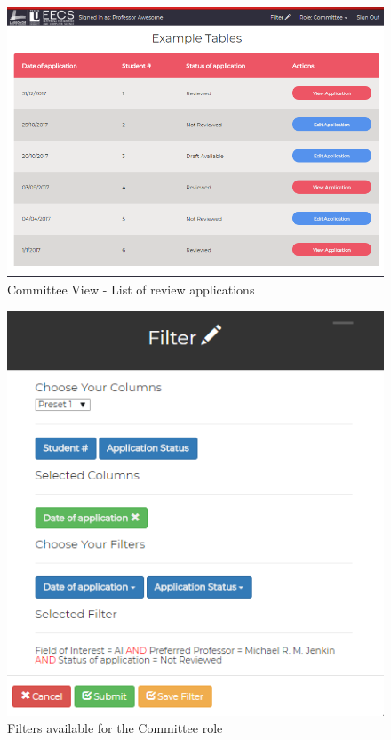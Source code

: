 \documentclass[fontsize=12pt,paper=letter,twoside]{scrartcl}
\begin{document}
\begin{figure}[!htb]
\begin{center}
\includegraphics[width=.99\textwidth]{images/committee_view.png}
\end{center}
\caption{Committee View - List of review applications}
\label{fig:committee_view}
\end{figure}

\begin{figure}[!htb]
\begin{center}
\includegraphics[width=.78\textwidth]{images/committee_filter.png}
\end{center}
\caption{Filters available for the Committee role}
\label{fig:committee_filter}
\end{figure}
\end{document}
